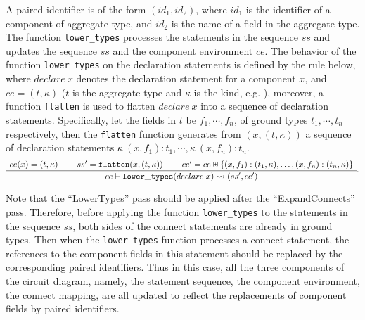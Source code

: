 {A paired identifier is of the form $(id_1, id_2)$, where $id_1$ is the identifier of a component of aggregate type, and $id_2$ is the name of a field in the aggregate type.
The function {\tt lower\_types} processes the statements in the sequence $ss$ and updates the sequence  $ss$ and the component environment $ce$.
The behavior of the function {\tt lower\_types} on the declaration statements is defined by the rule below, where $declare\ x$ denotes the declaration statement for a component $x$, and $ce=(t, \kappa)$ ($t$ is the aggregate type and $\kappa$ is the kind, e.g. ), moreover, a function  {\tt flatten} is used to flatten $declare\ x$ into a sequence of declaration statements.  Specifically, let the fields in $t$ be $f_1, \cdots, f_n$, of ground types $t_1, \cdots, t_n$ respectively, then the {\tt flatten} function generates from $(x, (t, \kappa))$ a sequence of declaration statements $\kappa\ (x, f_1): t_1, \cdots, \kappa\ (x, f_n): t_n$.
  {\begin{gather*}
    \inferiii[]
    {\seqq{ce\vdash{\tt lower\_types}(declare\;x) \rightsquigarrow (ss',ce')}}
    {\seqq{ce(x) = (t, \kappa)}}
    {\seqq{ ss' ={\tt flatten}(x, (t, \kappa))}}
    {\seqq{ce'=ce\uplus \{(x, f_1): (t_{1},\kappa), \dots,(x, f_n):(t_{n}, \kappa)\}}}.
    \end{gather*}}

Note that the ``LowerTypes'' pass should be applied after the ``ExpandConnects'' pass.
Therefore, before applying the function {\tt lower\_types} to the statements in the sequence $ss$, both sides of the connect statements are already in ground types.
Then when the {\tt lower\_types} function  processes a connect statement, the references to the component fields in this statement should be replaced by the corresponding paired identifiers. Thus in this case, all the three components of the circuit diagram, namely, the statement sequence, the component environment, the connect mapping, are all updated to reflect the replacements of component fields by paired identifiers.
}
